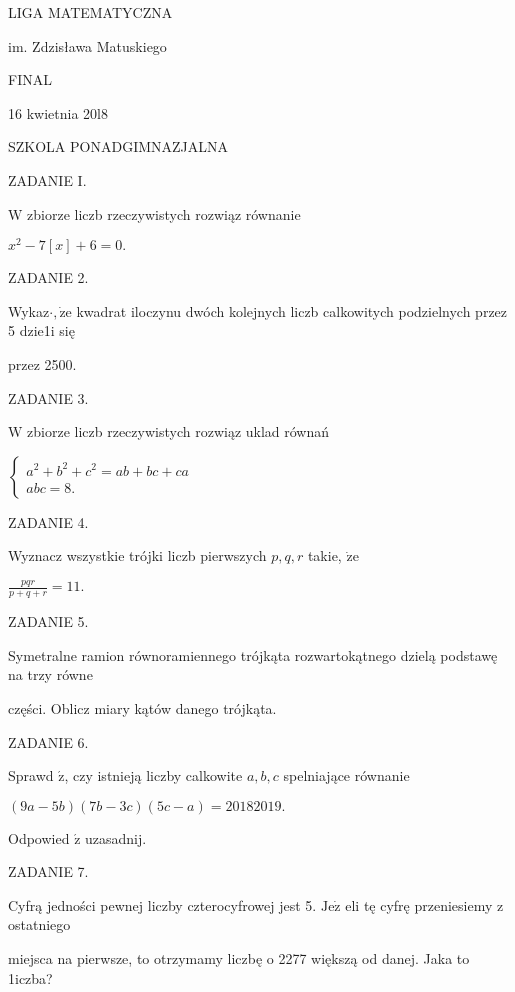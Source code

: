 \documentclass[a4paper,12pt]{article}
\begin{document}
LIGA MATEMATYCZNA

im. Zdzisława Matuskiego

FINAL

16 kwietnia 20l8

SZKOLA PONADGIMNAZJALNA

ZADANIE I.

$\mathrm{W}$ zbiorze liczb rzeczywistych rozwiąz równanie

$x^{2}-7[x]+6=0.$

ZADANIE 2.

Wykaz$\cdot, \dot{\mathrm{z}}\mathrm{e}$ kwadrat iloczynu dwóch kolejnych liczb calkowitych podzielnych przez 5 dzie1i się

przez 2500.

ZADANIE 3.

$\mathrm{W}$ zbiorze liczb rzeczywistych rozwiąz uklad równań

$\left\{\begin{array}{l}
a^{2}+b^{2}+c^{2}=ab+bc+ca\\
abc=8.
\end{array}\right.$

ZADANIE 4.

Wyznacz wszystkie trójki liczb pierwszych $p, q, r$ takie, $\dot{\mathrm{z}}\mathrm{e}$

$\displaystyle \frac{pqr}{p+q+r}=11.$

ZADANIE 5.

Symetralne ramion równoramiennego trójkąta rozwartokątnego dzielą podstawę na trzy równe

części. Oblicz miary kątów danego trójkąta.

ZADANIE 6.

Sprawd $\acute{\mathrm{z}}$, czy istnieją liczby calkowite $a, b, c$ spelniające równanie

$(9a-5b)(7b-3c)(5c-a)=20182019.$

Odpowied $\acute{\mathrm{z}}$ uzasadnij.

ZADANIE 7.

Cyfrą jedności pewnej liczby czterocyfrowej jest 5. $\mathrm{J}\mathrm{e}\dot{\mathrm{z}}$ eli tę cyfrę przeniesiemy z ostatniego

miejsca na pierwsze, to otrzymamy liczbę o 2277 większą od danej. Jaka to 1iczba?
\end{document}
